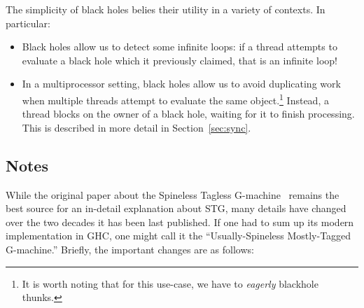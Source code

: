 The simplicity of black holes belies their utility in a variety of contexts.
In particular:

\begin{itemize}
\item Black holes allow us to detect some infinite loops: if a thread attempts
    to evaluate a black hole which it previously claimed, that is an infinite loop!
\item In a multiprocessor setting, black holes allow us to avoid duplicating work when multiple
    threads attempt to evaluate the same object.\footnote{It is worth noting that for this use-case, we have to \emph{eagerly} blackhole thunks.}  Instead, a thread blocks on the owner
    of a black hole, waiting for it to finish processing.  This is described in more
    detail in Section~\ref{sec:sync}.
\end{itemize}

\subsection{Notes}


While the original paper about the Spineless Tagless
G-machine~\cite{PeytonJones1992} remains the best source for an
in-detail explanation about STG, many details have changed over the two
decades it has been last published.  If one had to sum up its modern
implementation in GHC, one might call it the ``Usually-Spineless
Mostly-Tagged G-machine.''  Briefly, the important changes are as
follows:

